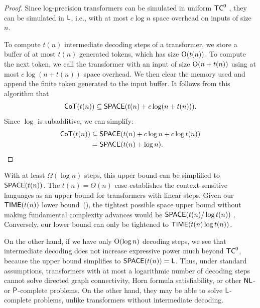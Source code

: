 \begin{proof}
    Since log-precision transformers can be simulated in uniform $\TC^0$ \citep{merrill2023parallelism}, they can be simulated in $\L$, i.e., with at most $c \log n$ space overhead on inputs of size $n$.

    To compute $t(n)$ intermediate decoding steps of a transformer, we store a buffer of at most $t(n)$ generated tokens, which has size $\O(t(n))$. To compute the next token, we call the transformer with an input of size $\O(n + t(n))$ using at most $c \log(n + t(n))$ space overhead.
    We then clear the memory used and append the finite token generated to the input buffer.
    It follows from this algorithm that
    \begin{equation*}
        \CoT(t(n)) \subseteq \SPACE(t(n) + c \log(n + t(n))) .
    \end{equation*}
    Since $\log$ is subadditive, we can simplify:
    \begin{align*}
        \CoT(t(n))
        &\subseteq \SPACE(t(n) + c \log n + c \log t(n)) \\
        &= \SPACE(t(n) + \log n) . \qedhere
    \end{align*}
\end{proof}

With at least $\Omega(\log n)$ steps, this upper bound can be simplified to $\SPACE(t(n))$.
The $t(n) = \Theta(n)$ case establishes the context-sensitive languages as an upper bound for transformers with linear steps.
Given our $\TIME(t(n))$ lower bound~(), the tightest possible space upper bound without making fundamental complexity advances would be $\SPACE(t(n) / \log t(n))$ \citep{Hopcroft1977OnTV}. Conversely, our lower bound can only be tightened to $\TIME(t(n) \log t(n))$.

On the other hand, if we have only $\O(\log n)$ decoding steps, we see that intermediate decoding does not increase expressive power much beyond $\TC^0$, because the upper bound simplifies to $\SPACE(t(n)) = \L$.
Thus, under standard assumptions, transformers with at most a logarithmic number of decoding steps cannot solve directed graph connectivity, Horn formula satisfiability, or other $\NL$- or $\P$-complete problems. On the other hand, they may be able to solve $\L$-complete problems, unlike transformers without intermediate decoding.
